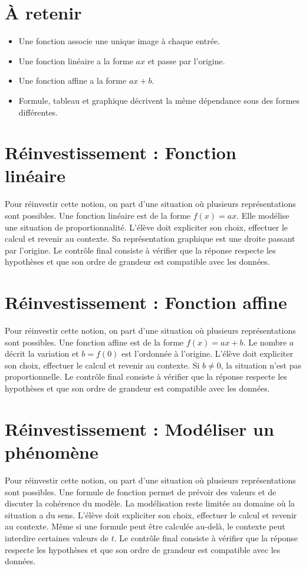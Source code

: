 \section{À retenir}
\begin{aretenir}
\begin{itemize}
\item Une fonction associe une unique image à chaque entrée.
\item Une fonction linéaire a la forme $ax$ et passe par l’origine.
\item Une fonction affine a la forme $ax+b$.
\item Formule, tableau et graphique décrivent la même dépendance sous des formes différentes.
\end{itemize}
\end{aretenir}

\section{Réinvestissement : Fonction linéaire}
Pour réinvestir cette notion, on part d’une situation où plusieurs représentations sont possibles. Une fonction linéaire est de la forme $f(x)=ax$. Elle modélise une situation de proportionnalité. L’élève doit expliciter son choix, effectuer le calcul et revenir au contexte. Sa représentation graphique est une droite passant par l’origine. Le contrôle final consiste à vérifier que la réponse respecte les hypothèses et que son ordre de grandeur est compatible avec les données.

\section{Réinvestissement : Fonction affine}
Pour réinvestir cette notion, on part d’une situation où plusieurs représentations sont possibles. Une fonction affine est de la forme $f(x)=ax+b$. Le nombre $a$ décrit la variation et $b=f(0)$ est l’ordonnée à l’origine. L’élève doit expliciter son choix, effectuer le calcul et revenir au contexte. Si $b\neq0$, la situation n’est pas proportionnelle. Le contrôle final consiste à vérifier que la réponse respecte les hypothèses et que son ordre de grandeur est compatible avec les données.

\section{Réinvestissement : Modéliser un phénomène}
Pour réinvestir cette notion, on part d’une situation où plusieurs représentations sont possibles. Une formule de fonction permet de prévoir des valeurs et de discuter la cohérence du modèle. La modélisation reste limitée au domaine où la situation a du sens. L’élève doit expliciter son choix, effectuer le calcul et revenir au contexte. Même si une formule peut être calculée au-delà, le contexte peut interdire certaines valeurs de $t$. Le contrôle final consiste à vérifier que la réponse respecte les hypothèses et que son ordre de grandeur est compatible avec les données.
